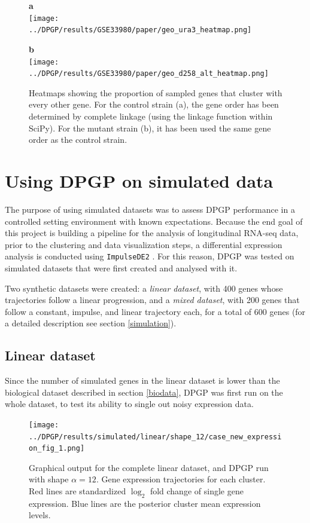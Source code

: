 \begin{figure}[!ht]
    \centering
    \parbox{.45\textwidth}{
        \textbf{a}\\
        \texttt{[image: ../DPGP/results/GSE33980/paper/geo\_ura3\_heatmap.png]}
    }
    \parbox{.45\textwidth}{
        \textbf{b}\\
        \texttt{[image: ../DPGP/results/GSE33980/paper/geo\_d258\_alt\_heatmap.png]}
    }
    \caption[Heatmap comparison with alternative order]{Heatmaps showing the proportion of sampled genes that cluster with every other gene. For the control strain (a), the gene order has been determined by complete linkage (using the linkage function within SciPy). For the mutant strain (b), it has been used the same gene order as the control strain.}\label{img:heatmap_alt}
\end{figure}

\section{Using DPGP on simulated data}\label{res:simulated}
The purpose of using simulated datasets was to assess DPGP performance in a controlled setting environment with known expectations. Because the end goal of this project is building a pipeline for the analysis of longitudinal RNA-seq data, prior to the clustering and data visualization steps, a differential expression analysis is conducted using \texttt{ImpulseDE2} \citep{fischerImpulseModelbasedDifferential2018}. For this reason, DPGP was tested on simulated datasets that were first created and analysed with it.

Two synthetic datasets were created: a \emph{linear dataset}, with 400 genes whose trajectories follow a linear progression, and a \emph{mixed dataset}, with 200 genes that follow a constant, impulse, and linear trajectory each, for a total of 600 genes (for a detailed description see section \ref{simulation}).

\subsection{Linear dataset}
Since the number of simulated genes in the linear dataset is lower than the biological dataset described in section \ref{biodata}, DPGP was first run on the whole dataset, to test its ability to single out noisy expression data.

\begin{figure}[!hp]
    \centering
    \texttt{[image: ../DPGP/results/simulated/linear/shape\_12/case\_new\_expression\_fig\_1.png]}
    \caption[DPGP output for linear dataset, shape 12]{Graphical output for the complete linear dataset, and DPGP run with shape $\alpha=12$. Gene expression trajectories for each cluster. Red lines are standardized $\log_{2}$ fold change of single gene expression. Blue lines are the posterior cluster mean expression levels.}\label{img:lin_12}
\end{figure}

